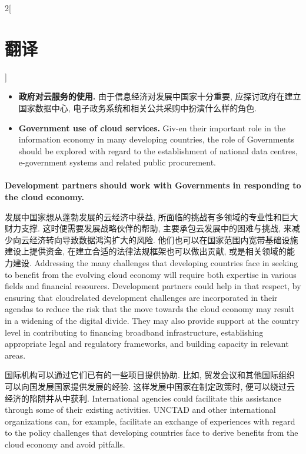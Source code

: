 \documentclass[a4paper, UTF8, 12pt]{article}
\begin{document}
\begin{paracol}{2}[\section{翻译}]
\begin{itemize}
        \switchcolumn*
        \item {\bfseries 政府对云服务的使用.} 由于信息经济对发展中国家十分重要, 应探讨政府在建立国家数据中心, 电子政务系统和相关公共采购中扮演什么样的角色.
        \switchcolumn
        \item {\bfseries Government use of cloud services.} Giv-en their important role in the information economy in many developing countries, the role of Governments should be explored with regard to the establishment of national data centres, e-government systems and related public procurement. 
    
    \end{itemize}

    \switchcolumn*
    \paragraph{} 
    \switchcolumn
    {\bfseries Development partners should work with Governments in responding to the cloud economy.}

    \switchcolumn*
    发展中国家想从蓬勃发展的云经济中获益, 所面临的挑战有多领域的专业性和巨大财力支撑. 这时便需要发展战略伙伴的帮助, 主要承包云发展中的困难与挑战, 来减少向云经济转向导致数据鸿沟扩大的风险. 他们也可以在国家范围内宽带基础设施建设上提供资金, 在建立合适的法律法规框架也可以做出贡献, 或是相关领域的能力建设.
    \switchcolumn
    Addressing the many challenges that developing countries face in seeking to benefit from the evolving cloud economy will require both expertise in various fields and financial resources. Development partners could help in that respect, by ensuring that cloudrelated development challenges are incorporated in their agendas to reduce the risk that the move towards the cloud economy may result in a widening of the digital divide. They may also provide support at the country level in contributing to financing broadband infrastructure, establishing appropriate legal and regulatory frameworks, and building capacity in relevant areas.

    \switchcolumn*
    国际机构可以通过它们已有的一些项目提供协助. 比如, 贸发会议和其他国际组织可以向国发展国家提供发展的经验. 这样发展中国家在制定政策时, 便可以绕过云经济的陷阱并从中获利.
    \switchcolumn
    International agencies could facilitate this assistance through some of their existing activities. UNCTAD and other international organizations can, for example, facilitate an exchange of experiences with regard to the policy challenges that developing countries face to derive benefits from the cloud economy and avoid pitfalls. 


\end{paracol}
\end{document}
